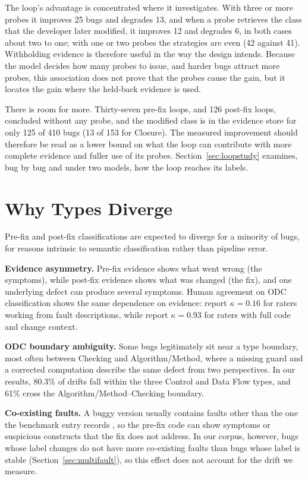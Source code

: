 \documentclass{iutbscthesis}
\begin{document}
The loop's advantage is concentrated where it investigates. With three or more probes it improves 25 bugs and degrades 13, and when a probe retrieves the class that the developer later modified, it improves 12 and degrades 6, in both cases about two to one; with one or two probes the strategies are even (42 against 41). Withholding evidence is therefore useful in the way the design intends. Because the model decides how many probes to issue, and harder bugs attract more probes, this association does not prove that the probes cause the gain, but it locates the gain where the held-back evidence is used.

There is room for more. Thirty-seven pre-fix loops, and 126 post-fix loops, concluded without any probe, and the modified class is in the evidence store for only 125 of 410 bugs (13 of 153 for Closure). The measured improvement should therefore be read as a lower bound on what the loop can contribute with more complete evidence and fuller use of its probes. Section~\ref{sec:loopstudy} examines, bug by bug and under two models, how the loop reaches its labels.

\section{Why Types Diverge}
\label{sec:divergence}

Pre-fix and post-fix classifications are expected to diverge for a minority of bugs, for reasons intrinsic to semantic classification rather than pipeline error.

\textbf{Evidence asymmetry.} Pre-fix evidence shows what went wrong (the symptoms), while post-fix evidence shows what was changed (the fix), and one underlying defect can produce several symptoms. Human agreement on ODC classification shows the same dependence on evidence: \textcite{henningsson2004assuring} report $\kappa = 0.16$ for raters working from fault descriptions, while \textcite{agnelo2020nosql} report $\kappa = 0.93$ for raters with full code and change context.

\textbf{ODC boundary ambiguity.} Some bugs legitimately sit near a type boundary, most often between Checking and Algorithm/Method, where a missing guard and a corrected computation describe the same defect from two perspectives. In our results, 80.3\% of drifts fall within the three Control and Data Flow types, and 61\% cross the Algorithm/Method--Checking boundary.

\textbf{Co-existing faults.} A buggy version usually contains faults other than the one the benchmark entry records \cite{callaghan2024mf}, so the pre-fix code can show symptoms or suspicious constructs that the fix does not address. In our corpus, however, bugs whose label changes do not have more co-existing faults than bugs whose label is stable (Section~\ref{sec:multifault}), so this effect does not account for the drift we measure.
\end{document}
